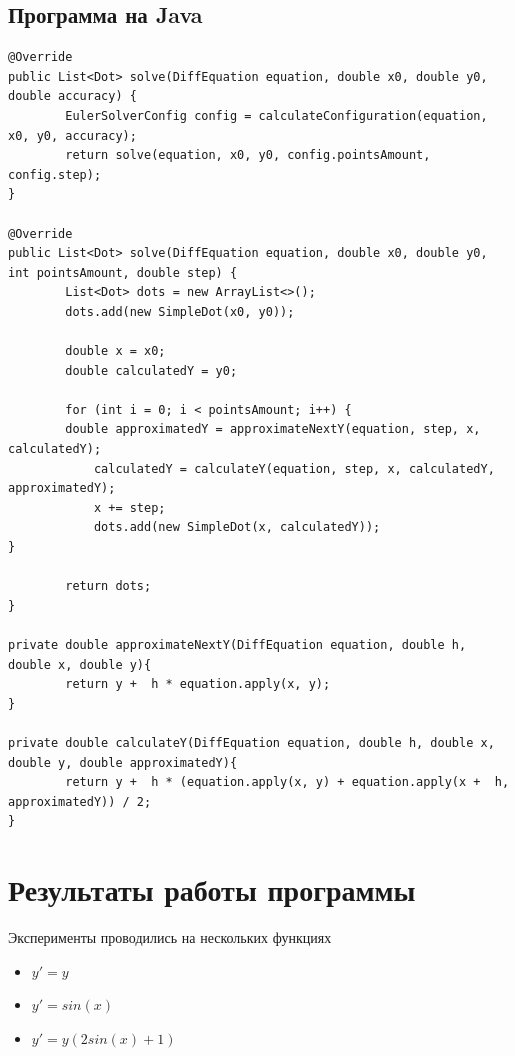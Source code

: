 \documentclass[11pt, english]{article}
\begin{document}
    \newpage

    \subsection{Программа на Java}
    \begin{lstlisting}
@Override
public List<Dot> solve(DiffEquation equation, double x0, double y0, double accuracy) {
        EulerSolverConfig config = calculateConfiguration(equation, x0, y0, accuracy);
        return solve(equation, x0, y0, config.pointsAmount, config.step);
}

@Override
public List<Dot> solve(DiffEquation equation, double x0, double y0, int pointsAmount, double step) {
        List<Dot> dots = new ArrayList<>();
        dots.add(new SimpleDot(x0, y0));

        double x = x0;
        double calculatedY = y0;

        for (int i = 0; i < pointsAmount; i++) {
        double approximatedY = approximateNextY(equation, step, x, calculatedY);
            calculatedY = calculateY(equation, step, x, calculatedY, approximatedY);
            x += step;
            dots.add(new SimpleDot(x, calculatedY));
}

        return dots;
}

private double approximateNextY(DiffEquation equation, double h, double x, double y){
        return y +  h * equation.apply(x, y);
}

private double calculateY(DiffEquation equation, double h, double x, double y, double approximatedY){
        return y +  h * (equation.apply(x, y) + equation.apply(x +  h, approximatedY)) / 2;
}

    \end{lstlisting}
    \newpage


    \section{Результаты работы программы}
    Эксперименты проводились на нескольких функциях
    \begin{itemize}
        \item $y' = y$
        \item $y' = sin(x)$
        \item $y' = y( 2sin(x) + 1)$
    \end{itemize}
\end{document}

